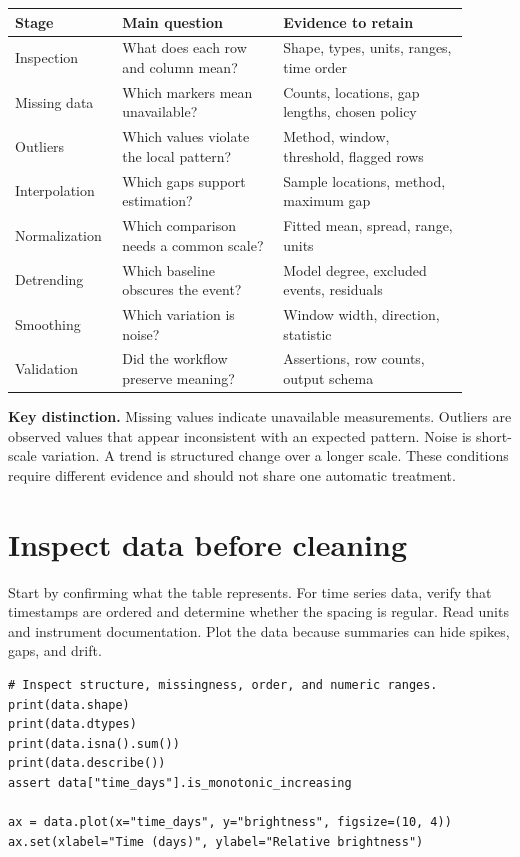 \documentclass[11pt,letterpaper]{article}
\begin{document}
\begin{center}
\begin{tabular}{@{}p{0.19\linewidth}p{0.33\linewidth}p{0.38\linewidth}@{}}
\toprule
Stage & Main question & Evidence to retain \\
\midrule
Inspection & What does each row and column mean? & Shape, types, units, ranges, time order \\
Missing data & Which markers mean unavailable? & Counts, locations, gap lengths, chosen policy \\
Outliers & Which values violate the local pattern? & Method, window, threshold, flagged rows \\
Interpolation & Which gaps support estimation? & Sample locations, method, maximum gap \\
Normalization & Which comparison needs a common scale? & Fitted mean, spread, range, units \\
Detrending & Which baseline obscures the event? & Model degree, excluded events, residuals \\
Smoothing & Which variation is noise? & Window width, direction, statistic \\
Validation & Did the workflow preserve meaning? & Assertions, row counts, output schema \\
\bottomrule
\end{tabular}
\end{center}

\textbf{Key distinction.} Missing values indicate unavailable measurements.
Outliers are observed values that appear inconsistent with an expected pattern.
Noise is short-scale variation. A trend is structured change over a longer
scale. These conditions require different evidence and should not share one
automatic treatment.

\section{Inspect data before cleaning}

Start by confirming what the table represents. For time series data, verify
that timestamps are ordered and determine whether the spacing is regular. Read
units and instrument documentation. Plot the data because summaries can hide
spikes, gaps, and drift.

\begin{lstlisting}
# Inspect structure, missingness, order, and numeric ranges.
print(data.shape)
print(data.dtypes)
print(data.isna().sum())
print(data.describe())
assert data["time_days"].is_monotonic_increasing

ax = data.plot(x="time_days", y="brightness", figsize=(10, 4))
ax.set(xlabel="Time (days)", ylabel="Relative brightness")
\end{lstlisting}
\end{document}
